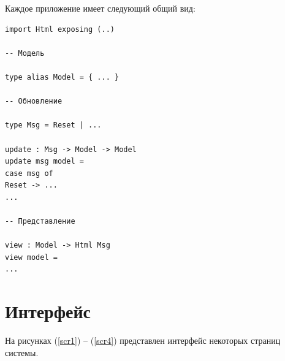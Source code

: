 Каждое приложение имеет следующий общий вид:
\begin{lstlisting}
import Html exposing (..)

-- Модель

type alias Model = { ... }

-- Обновление

type Msg = Reset | ...

update : Msg -> Model -> Model
update msg model =
case msg of
Reset -> ...
...

-- Представление

view : Model -> Html Msg
view model =
...
\end{lstlisting}

\section{Интерфейс}
На рисунках (\ref{scr1}) -- (\ref{scr4}) представлен интерфейс некоторых страниц системы.

